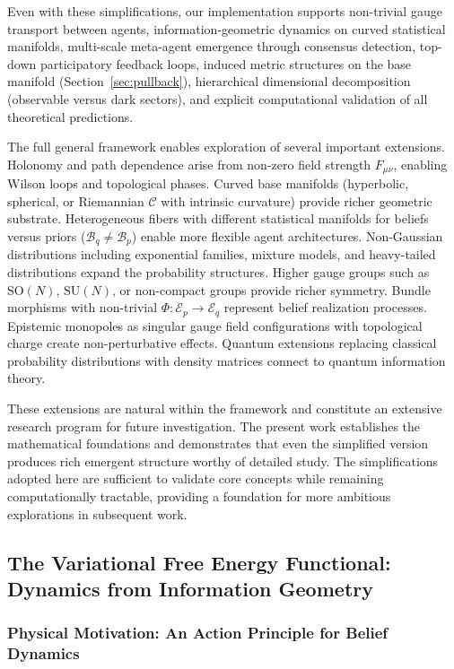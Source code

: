 \documentclass[11pt]{article}
\begin{document}
Even with these simplifications, our implementation supports non-trivial gauge transport between agents, information-geometric dynamics on curved statistical manifolds, multi-scale meta-agent emergence through consensus detection, top-down participatory feedback loops, induced metric structures on the base manifold (Section~\ref{sec:pullback}), hierarchical dimensional decomposition (observable versus dark sectors), and explicit computational validation of all theoretical predictions.

The full general framework enables exploration of several important extensions. Holonomy and path dependence arise from non-zero field strength $F_{\mu\nu}$, enabling Wilson loops and topological phases. Curved base manifolds (hyperbolic, spherical, or Riemannian $\mathcal{C}$ with intrinsic curvature) provide richer geometric substrate. Heterogeneous fibers with different statistical manifolds for beliefs versus priors ($\mathcal{B}_q \neq \mathcal{B}_p$) enable more flexible agent architectures. Non-Gaussian distributions including exponential families, mixture models, and heavy-tailed distributions expand the probability structures. Higher gauge groups such as $\mathrm{SO}(N)$, $\mathrm{SU}(N)$, or non-compact groups provide richer symmetry. Bundle morphisms with non-trivial $\Phi: \mathcal{E}_p \to \mathcal{E}_q$ represent belief realization processes. Epistemic monopoles as singular gauge field configurations with topological charge create non-perturbative effects. Quantum extensions replacing classical probability distributions with density matrices connect to quantum information theory.

These extensions are natural within the framework and constitute an extensive research program for future investigation. The present work establishes the mathematical foundations and demonstrates that even the simplified version produces rich emergent structure worthy of detailed study. The simplifications adopted here are sufficient to validate core concepts while remaining computationally tractable, providing a foundation for more ambitious explorations in subsequent work.

\subsection{The Variational Free Energy Functional: Dynamics from Information Geometry}

\subsubsection{Physical Motivation: An Action Principle for Belief Dynamics}
\end{document}
